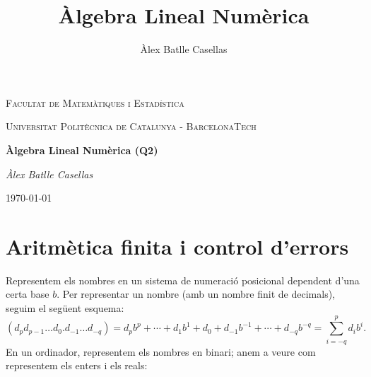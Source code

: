 \documentclass[11pt]{article}
\title{Àlgebra Lineal Numèrica}
\author{Àlex Batlle Casellas}
\begin{document}
\setcounter{section}{-1}
\begin{titlepage}
	\centering
	{\scshape\LARGE Facultat de Matemàtiques i Estadística \par}
	\vspace{1cm}
	{\scshape\Large Universitat Politècnica de Catalunya - BarcelonaTech\par}
	\vspace{1.5cm}
	{\huge\bfseries Àlgebra Lineal Numèrica (Q2)
	\par}
	\vspace{2cm}
	{\Large\itshape Àlex Batlle Casellas\par}

	\vfill

	{\large \today\par}
\end{titlepage}


\vfill
\newpage\tableofcontents\newpage
\section{Aritmètica finita i control d'errors}
Representem els nombres en un sistema de numeració posicional dependent d'una certa base $b$. Per representar un nombre (amb un nombre finit de decimals), seguim el següent esquema:
\[
\left(d_pd_{p-1}\ldots d_0.d_{-1}\ldots d_{-q}\right)=d_pb^p+\cdots+d_1b^1+d_0+d_{-1}b^{-1}+\cdots+d_{-q}b^{-q}=\sum_{i=-q}^pd_ib^i.
\]
En un ordinador, representem els nombres en binari; anem a veure com representem els enters i els reals:
\end{document}
